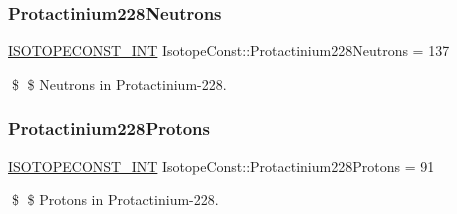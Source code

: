 \subsubsection{\texorpdfstring{Protactinium228\+Neutrons}{Protactinium228Neutrons}}
{\footnotesize\ttfamily \mbox{\hyperlink{group___isotope_const-_macros_ga5f18360b3e99483a35c32d789e62621c}{I\+S\+O\+T\+O\+P\+E\+C\+O\+N\+S\+T\+\_\+\+I\+NT}} Isotope\+Const\+::\+Protactinium228\+Neutrons = 137}

\$ \$ Neutrons in Protactinium-\/228. \mbox{\label{group___isotope_const-_protactinium-_pa228_ga5b46591311c48aa4e5bb27e2378ff69e}} 
\subsubsection{\texorpdfstring{Protactinium228\+Protons}{Protactinium228Protons}}
{\footnotesize\ttfamily \mbox{\hyperlink{group___isotope_const-_macros_ga5f18360b3e99483a35c32d789e62621c}{I\+S\+O\+T\+O\+P\+E\+C\+O\+N\+S\+T\+\_\+\+I\+NT}} Isotope\+Const\+::\+Protactinium228\+Protons = 91}

\$ \$ Protons in Protactinium-\/228. 